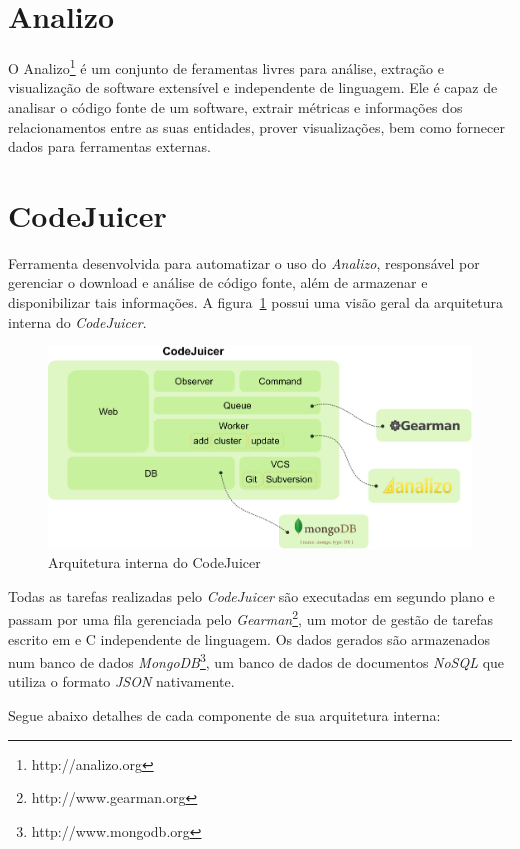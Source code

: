 \documentclass[conference]{IEEEtran}
\begin{document}
\section{Analizo}

O Analizo\footnote{http://analizo.org} é um conjunto de feramentas livres para
análise, extração e visualização de software extensível e independente de
linguagem. Ele é capaz de analisar o código fonte de um software, extrair
métricas e informações dos relacionamentos entre as suas entidades,
prover visualizações, bem como fornecer dados para ferramentas externas.

\section{CodeJuicer}

Ferramenta desenvolvida para automatizar o uso do {\it Analizo}, responsável
por gerenciar o download e análise de código fonte, além de armazenar e disponibilizar
tais informações. A figura~\ref{fig:codejuicer-design} possui uma visão geral
da arquitetura interna do {\it CodeJuicer}.

\begin{figure}[h]
\center
\includegraphics[scale=0.4]{codejuicer-design.eps}
\caption{Arquitetura interna do CodeJuicer}
\label{fig:codejuicer-design}
\end{figure}

Todas as tarefas realizadas pelo {\it CodeJuicer} são executadas em segundo
plano e passam por uma fila gerenciada pelo {\it
Gearman}\footnote{http://www.gearman.org}, um motor de gestão de tarefas
escrito em e C independente de linguagem. Os dados gerados são armazenados num
banco de dados {\it MongoDB}\footnote{http://www.mongodb.org}, um banco de
dados de documentos {\it NoSQL} que utiliza o formato {\it JSON} nativamente.

Segue abaixo detalhes de cada componente de sua arquitetura interna:
\end{document}
